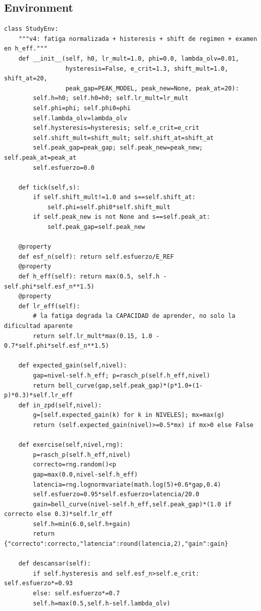 \documentclass{article}
\begin{document}
\subsection{Environment}
\begin{verbatim}
class StudyEnv:
    """v4: fatiga normalizada + histeresis + shift de regimen + examen en h_eff."""
    def __init__(self, h0, lr_mult=1.0, phi=0.0, lambda_olv=0.01,
                 hysteresis=False, e_crit=1.3, shift_mult=1.0, shift_at=20,
                 peak_gap=PEAK_MODEL, peak_new=None, peak_at=20):
        self.h=h0; self.h0=h0; self.lr_mult=lr_mult
        self.phi=phi; self.phi0=phi
        self.lambda_olv=lambda_olv
        self.hysteresis=hysteresis; self.e_crit=e_crit
        self.shift_mult=shift_mult; self.shift_at=shift_at
        self.peak_gap=peak_gap; self.peak_new=peak_new; self.peak_at=peak_at
        self.esfuerzo=0.0

    def tick(self,s):
        if self.shift_mult!=1.0 and s==self.shift_at:
            self.phi=self.phi0*self.shift_mult
        if self.peak_new is not None and s==self.peak_at:
            self.peak_gap=self.peak_new

    @property
    def esf_n(self): return self.esfuerzo/E_REF
    @property
    def h_eff(self): return max(0.5, self.h - self.phi*self.esf_n**1.5)
    @property
    def lr_eff(self):
        # la fatiga degrada la CAPACIDAD de aprender, no solo la dificultad aparente
        return self.lr_mult*max(0.15, 1.0 - 0.7*self.phi*self.esf_n**1.5)

    def expected_gain(self,nivel):
        gap=nivel-self.h_eff; p=rasch_p(self.h_eff,nivel)
        return bell_curve(gap,self.peak_gap)*(p*1.0+(1-p)*0.3)*self.lr_eff
    def in_zpd(self,nivel):
        g=[self.expected_gain(k) for k in NIVELES]; mx=max(g)
        return (self.expected_gain(nivel)>=0.5*mx) if mx>0 else False

    def exercise(self,nivel,rng):
        p=rasch_p(self.h_eff,nivel)
        correcto=rng.random()<p
        gap=max(0.0,nivel-self.h_eff)
        latencia=rng.lognormvariate(math.log(5)+0.6*gap,0.4)
        self.esfuerzo=0.95*self.esfuerzo+latencia/20.0
        gain=bell_curve(nivel-self.h_eff,self.peak_gap)*(1.0 if correcto else 0.3)*self.lr_eff
        self.h=min(6.0,self.h+gain)
        return {"correcto":correcto,"latencia":round(latencia,2),"gain":gain}

    def descansar(self):
        if self.hysteresis and self.esf_n>self.e_crit: self.esfuerzo*=0.93
        else: self.esfuerzo*=0.7
        self.h=max(0.5,self.h-self.lambda_olv)
\end{verbatim}
\end{document}
